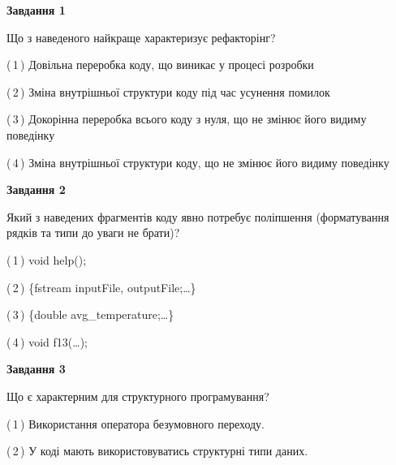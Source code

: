 \documentclass[10pt, ukrainian]{article}
\begin{document}
{
\begin {large}
{\begin {center}\textbf{Завдання 1}\end {center}}\par
Що з наведеного найкраще характеризує рефакторінг?\par
\vspace{2mm}



(\,1\,) Довільна переробка коду, що виникає у процесі розробки%



(\,2\,) Зміна внутрішньої структури коду під час усунення помилок%



(\,3\,) Докорінна переробка всього коду з нуля,  що не змінює його видиму поведінку%



(\,4\,) Зміна внутрішньої структури коду, що не змінює його видиму поведінку%


{\begin {center}\textbf{Завдання 2}\end {center}}\par
Який з наведених фрагментів коду явно потребує поліпшення (форматування рядків та типи до уваги не брати)?\par
\vspace{2mm}



(\,1\,) void help();%



(\,2\,) \{fstream inputFile, outputFile;…\} %



(\,3\,) \{double avg\_temperature;…\} %



(\,4\,) void f13(…);%


{\begin {center}\textbf{Завдання 3}\end {center}}\par
Що є характерним для структурного програмування?\par
\vspace{2mm}



(\,1\,) Використання оператора безумовного переходу. %



(\,2\,) У коді мають використовуватись структурні типи даних. %




\end{large}}
\end{document}
